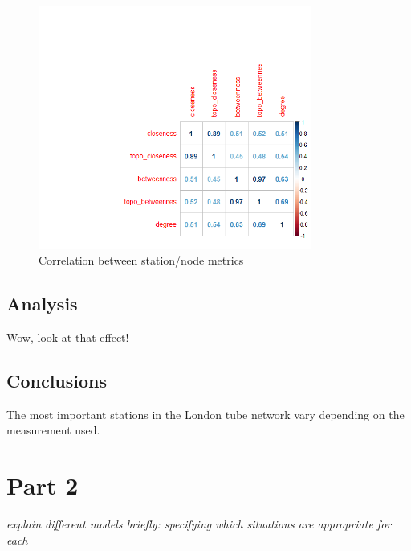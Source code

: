 \documentclass[11pt]{article} %
\begin{document}
\begin{figure}
\centering
\includegraphics[width=0.8\textwidth]{Corr_tube_graph_node_stats}
\caption{Correlation between station/node metrics}
\end{figure}


\begin{center}
\end{center}

\begin{center}
\end{center}

\subsection{Analysis}

Wow, look at that effect!


\subsection{Conclusions}

The most important stations in the London tube network vary depending on the measurement used. 



\section{Part 2}

\textit{explain different models briefly: specifying which situations are appropriate for each}
\end{document}
